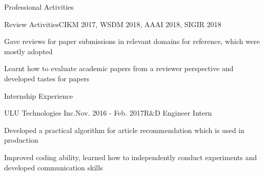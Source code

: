 \documentclass{resume} %
\begin{document}
\begin{rSection}{Professional Activities}
\begin{rSubsection}{Review Activities}{CIKM 2017, WSDM 2018, AAAI 2018, SIGIR 2018}{}{}
\item Gave reviews for paper submissions in relevant domains for reference, which were mostly adopted
\item Learnt how to evaluate academic papers from a reviewer perspective and developed tastes for papers 
\end{rSubsection}
\end{rSection}


\begin{rSection}{Internship Experience}
\begin{rSubsection}{ULU Technologies Inc.}{Nov. 2016 - Feb. 2017}{R$\&$D  Engineer Intern}{}
\item Developed a practical algorithm for article recommendation which is used in production 
\item Improved coding ability, learned how to independently conduct experiments and developed communication skills
\end{rSubsection}
\end{rSection}


\end{document}
